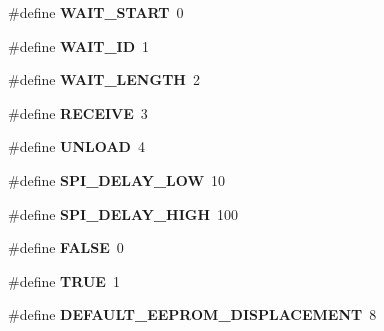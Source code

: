 \begin{DoxyCompactItemize}
\#define {\bfseries W\+A\+I\+T\+\_\+\+S\+T\+A\+RT}~0
\item 
\mbox{\label{globals_8h_a6a6a0bb02e515a094c3e7ea1bcb66fcc}} 
\#define {\bfseries W\+A\+I\+T\+\_\+\+ID}~1
\item 
\mbox{\label{globals_8h_a235d2d0eac7e9af190ebafb84df37fd9}} 
\#define {\bfseries W\+A\+I\+T\+\_\+\+L\+E\+N\+G\+TH}~2
\item 
\mbox{\label{globals_8h_a3b4d8a5e259fa47a909adefcda3bfb80}} 
\#define {\bfseries R\+E\+C\+E\+I\+VE}~3
\item 
\mbox{\label{globals_8h_abf4aedd34d31b63b63061c975d872580}} 
\#define {\bfseries U\+N\+L\+O\+AD}~4
\item 
\mbox{\label{globals_8h_a42c6406a75a89d50c9f1b9c86388565c}} 
\#define {\bfseries S\+P\+I\+\_\+\+D\+E\+L\+A\+Y\+\_\+\+L\+OW}~10
\item 
\mbox{\label{globals_8h_a054002df34537a2a4ff6f520b65f1ba4}} 
\#define {\bfseries S\+P\+I\+\_\+\+D\+E\+L\+A\+Y\+\_\+\+H\+I\+GH}~100
\item 
\mbox{\label{globals_8h_aa93f0eb578d23995850d61f7d61c55c1}} 
\#define {\bfseries F\+A\+L\+SE}~0
\item 
\mbox{\label{globals_8h_aa8cecfc5c5c054d2875c03e77b7be15d}} 
\#define {\bfseries T\+R\+UE}~1
\item 
\mbox{\label{globals_8h_a0f5a7e2ead9cd507bf8fc9a6f785f012}} 
\#define {\bfseries D\+E\+F\+A\+U\+L\+T\+\_\+\+E\+E\+P\+R\+O\+M\+\_\+\+D\+I\+S\+P\+L\+A\+C\+E\+M\+E\+NT}~8
\end{DoxyCompactItemize}
